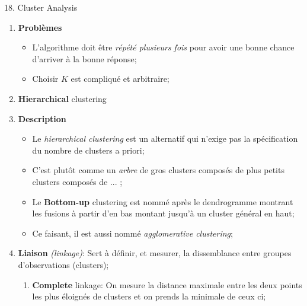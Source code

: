 \documentclass[12pt, titlepage, french]{report}
\begin{document}
\begin{CHPT_SUMM}[label = {CLUSTERS}]{18. Cluster Analysis}
\begin{enumerate}
\begin{itemize}
\begin{align*}
			\end{align*}
		\item	L'algorithme est:
			\begin{enumerate}[label = \roman*.]
			\item	Arbitrairement, classez les observations en $K$ clusters;
			\item	Pour chacun des clusters, calculer le centroïde;
			\item	Créer de nouveaux clusters en associant chaque point au centroïde le plus près;
			\item	Répéter la 2e et 3e étape jusqu'à ce que les points restent fixes;
			\end{enumerate}
		\end{itemize}
	\item[]	\textbf{Problèmes}
		\begin{itemize}
		\item	L'algorithme doit être \textit{répété plusieurs fois} pour avoir une bonne chance d'arriver à la bonne réponse;
		\item	Choisir $K$ est compliqué et arbitraire;
		\end{itemize}
	\item	\textbf{Hierarchical} clustering
	\item[]	\textbf{Description}
		\begin{itemize}
		\item	Le \textit{hierarchical clustering} est un alternatif qui n'exige pas la spécification du nombre de clusters a priori;
		\item	C'est plutôt comme un \textit{arbre} de gros clusters composés de plus petits clusters composés de ... ;
		\item	Le \textbf{Bottom-up} clustering est nommé après le dendrogramme montrant les fusions à partir d'en bas montant jusqu'à un cluster général en haut;
		\item[]	Ce faisant, il est aussi nommé \textit{agglomerative clustering};
		\end{itemize}
	\item[]	\textbf{Liaison} \textit{(linkage)}: Sert à définir, et mesurer, la dissemblance entre groupes d'observations (clusters);
		\begin{enumerate}
		\item	\textbf{Complete} linkage: On mesure la distance maximale entre les deux points les plus éloignés de clusters et on prends la minimale de ceux ci;

\end{enumerate}
\end{enumerate}
\end{CHPT_SUMM}
\end{document}
